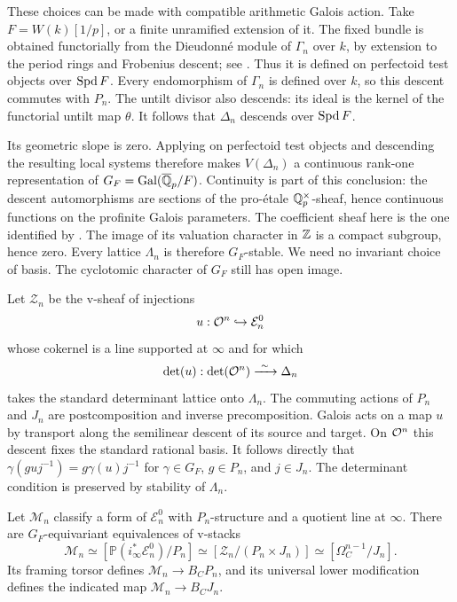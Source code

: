 These choices can be made with compatible arithmetic Galois action.
Take $F=W(k)[1/p]$, or a finite unramified extension of it.
The fixed bundle is obtained functorially from the Dieudonn\'e module
of $\Gamma_n$ over $k$, by extension to the period rings and Frobenius
descent; see \cite[Lemma 2.3.3 and the following paragraph,
pp.~23--24]{BMR2026}.  Thus it is defined on perfectoid test objects
over $\operatorname{Spd} F$.  Every endomorphism of $\Gamma_n$ is defined over $k$,
so this descent commutes with $P_n$.  The untilt divisor also descends:
its ideal is the kernel of the functorial untilt map $\theta$.
It follows that $\Delta_n$ descends over $\operatorname{Spd} F$.

Its geometric slope is zero.  Applying
\cite[Corollary II.2.20]{FS} on perfectoid test objects and descending
the resulting local systems therefore makes $V(\Delta_n)$ a
continuous rank-one representation of
$G_F=\operatorname{Gal}(\overline{\mathbb Q}_p/F)$.
Continuity is part of this conclusion: the descent automorphisms are
sections of the pro-\'etale $\mathbb Q_p^\times$-sheaf, hence continuous
functions on the profinite Galois parameters.  The coefficient sheaf
here is the one identified by \cite[Proposition II.2.5(ii)]{FS}.
The image of its valuation character in $\mathbb Z$ is a compact subgroup,
hence zero.  Every lattice $\Lambda_n$ is therefore $G_F$-stable.
We need no invariant choice of basis.  The cyclotomic character of
$G_F$ still has open image.

Let $\mathcal Z_n$ be the v-sheaf of injections
\[
 u:\mathcal O^n\hookrightarrow\mathcal E_n^0
\]
whose cokernel is a line supported at $\infty$ and for which
\[
 \det(u):\det(\cO^n)\xrightarrow{\ \sim\ }\Delta_n
\]
takes the standard determinant lattice onto $\Lambda_n$.
The commuting actions of $P_n$ and $J_n$ are postcomposition and
inverse precomposition.
Galois acts on a map $u$ by transport along the semilinear descent of
its source and target.  On $\mathcal O^n$ this descent fixes the standard
rational basis.  It follows directly that $\gamma(guj^{-1})
=g\gamma(u)j^{-1}$ for $\gamma\in G_F$, $g\in P_n$, and $j\in J_n$.
The determinant condition is preserved by stability of $\Lambda_n$.

\begin{proposition}\label{prop:two-realizations}
Let $\mathcal M_n$ classify a form of $\mathcal E_n^0$ with
$P_n$-structure and a quotient line at $\infty$.  There are
$G_F$-equivariant equivalences of v-stacks
\begin{equation}\label{eq:two-realizations}
 \mathcal M_n
 \simeq [\mathbb P(i_\infty^*\mathcal E_n^0)/P_n]
 \simeq [\mathcal Z_n/(P_n\times J_n)]
 \simeq [\Omega_C^{n-1}/J_n].
\end{equation}
Its framing torsor defines $\mathcal M_n\to B_CP_n$, and its universal
lower modification defines the indicated map $\mathcal M_n\to B_CJ_n$.
\end{proposition}

